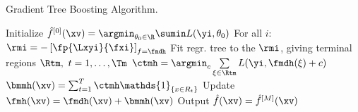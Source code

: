 \begin{algorithm}[H]
  \begin{footnotesize}
  \begin{center}
  \caption{Gradient Tree Boosting Algorithm.}
    \begin{algorithmic}[1]
      \State Initialize $\hat{f}^{[0]}(\xv) = \argmin_{\theta_0\in\R} \sumin L(\yi, \theta_0)$
          \State For all $i$: $\rmi = -\left[\fp{\Lxyi}{\fxi}\right]_{f=\fmdh}$
          \State Fit regr. tree to the $\rmi$, giving terminal regions $\Rtm,
          \ t = 1,\ldots,\Tm$
          \State $\ctmh = \argmin_{c} \sum \limits_{\xi \in \Rtm} L(\yi, \fmdh(\xi) + c)$
        \EndFor
        \State $\bmmh(\xv) = \sum_{t=1}^{T} \ctmh \mathds{1}_{\{x \in R_t\}} $
        \State Update $\fmh(\xv) = \fmdh(\xv) + \bmmh(\xv)$
      \EndFor
      \State Output $\hat{f}(\xv) = \hat{f}^{[M]}(\xv)$
    \end{algorithmic}
    \end{center}
    \end{footnotesize}
\end{algorithm}

